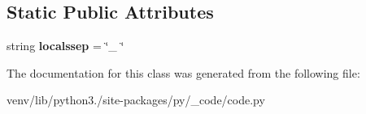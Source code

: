 \subsection*{Static Public Attributes}
\begin{DoxyCompactItemize}
\item 
\mbox{\label{classpy_1_1__code_1_1code_1_1_repr_entry_a40180b64e1563796fe8d0f6e96c80616}} 
string {\bfseries localssep} = \char`\"{}\+\_\+ \char`\"{}
\end{DoxyCompactItemize}


The documentation for this class was generated from the following file\+:\begin{DoxyCompactItemize}
\item 
venv/lib/python3./site-\/packages/py/\+\_\+code/code.\+py\end{DoxyCompactItemize}

